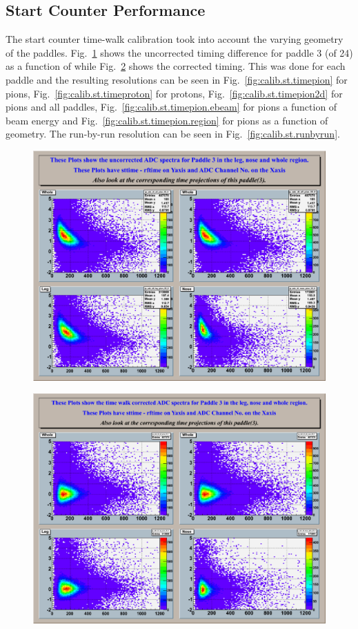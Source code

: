 \subsection{\label{sec:calib.st}Start Counter Performance}

The start counter time-walk calibration took into account the varying geometry of the paddles. Fig.~\ref{fig:calib.st.adcuncor} shows the uncorrected timing difference for paddle 3 (of 24) as a function of  while Fig.~\ref{fig:calib.st.adccor} shows the corrected timing. This was done for each paddle and the resulting resolutions can be seen in Fig.~\ref{fig:calib.st.timepion} for pions, Fig.~\ref{fig:calib.st.timeproton} for protons, Fig.~\ref{fig:calib.st.timepion2d} for pions and all paddles, Fig.~\ref{fig:calib.st.timepion.ebeam} for pions a function of beam energy and Fig.~\ref{fig:calib.st.timepion.region} for pions as a function of geometry. The run-by-run resolution can be seen in Fig.~\ref{fig:calib.st.runbyrun}.

\begin{figure}[htbp]\begin{center}
\includegraphics[width=0.65\columnwidth]{figures/calib/st/Uncorrected_adc.eps}
\caption[]{\label{fig:calib.st.adcuncor}}
\end{center}\end{figure}

\begin{figure}[htbp]\begin{center}
\includegraphics[width=0.65\columnwidth]{figures/calib/st/Corrected_adc.eps}
\caption[]{\label{fig:calib.st.adccor}}
\end{center}\end{figure}


